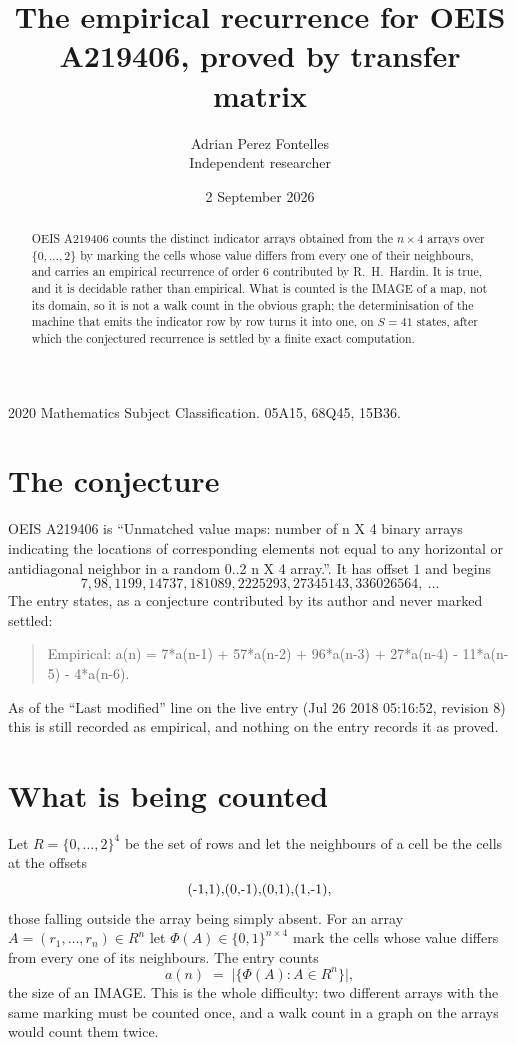 \documentclass[11pt,a4paper]{article}
\title{The empirical recurrence for OEIS A219406, proved by transfer matrix}
\author{Adrian Perez Fontelles\\ \small Independent researcher}
\date{2 September 2026}
\theoremstyle{plain}
\theoremstyle{definition}
\begin{document}
\maketitle

\begin{abstract}
OEIS A219406 counts the distinct indicator arrays obtained from the $n\times4$ arrays over
$\{0,\dots,2\}$ by marking the cells whose value differs from every one of their neighbours, and carries an
empirical recurrence of order $6$ contributed by R.~H.~Hardin. It is true, and it is
decidable rather than empirical. What is counted is the IMAGE of a map, not its domain, so it
is not a walk count in the obvious graph; the determinisation of the machine that emits the
indicator row by row turns it into one, on $S=41$ states, after which the conjectured
recurrence is settled by a finite exact computation.
\end{abstract}

\noindent\small 2020 Mathematics Subject Classification. 05A15, 68Q45, 15B36.\normalsize

\section{The conjecture}

OEIS A219406 is ``Unmatched value maps: number of n X 4 binary arrays indicating the locations of corresponding elements not equal to any horizontal or antidiagonal neighbor in a random 0..2 n X 4 array.''. It has offset $1$ and begins
\[
7, 98, 1199, 14737, 181089, 2225293, 27345143, 336026564,\ \dots
\]
The entry states, as a conjecture contributed by its author and never marked settled:
\begin{quote}
Empirical: a(n) = 7*a(n-1) + 57*a(n-2) + 96*a(n-3) + 27*a(n-4) - 11*a(n-5) - 4*a(n-6).
\end{quote}
As of the ``Last modified'' line on the live entry (Jul 26 2018 05:16:52, revision 8) this is still
recorded as empirical, and nothing on the entry records it as proved.

\section{What is being counted}

Let $R=\{0,\dots,2\}^{4}$ be the set of rows and let the neighbours of a cell be the
cells at the offsets
\[
$(-1,1)$, $(0,-1)$, $(0,1)$, $(1,-1)$,
\]
those falling outside the array being simply absent. For an array
$A=(r_1,\dots,r_n)\in R^n$ let $\Phi(A)\in\{0,1\}^{n\times4}$ mark the cells whose value
differs from every one of its neighbours. The entry counts
\[
a(n)\;=\;\bigl|\{\Phi(A):A\in R^n\}\bigr| ,
\]
the size of an IMAGE. This is the whole difficulty: two different arrays with the same marking
must be counted once, and a walk count in a graph on the arrays would count them twice.
\end{document}

